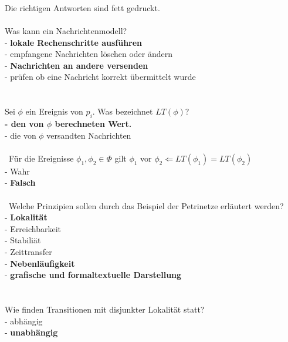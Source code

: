 \documentclass[a4paper,12pt]{scrartcl}
\begin{document}
\subsubsection{}
Die richtigen Antworten sind fett gedruckt.\\\\
Was kann ein Nachrichtenmodell?\\
- \textbf{lokale Rechenschritte ausführen}\\
- empfangene Nachrichten löschen oder ändern\\
- \textbf{Nachrichten an andere versenden}\\
- prüfen ob eine Nachricht korrekt übermittelt wurde\\\\\\
Sei $\phi$ ein Ereignis von $p_i$. Was bezeichnet $LT(\phi)$?\\
\textbf{- den von $\phi$ berechneten Wert.\\}
- die von $\phi$ versandten Nachrichten\\
\\\
Für die Ereignisse $\phi_1 ,\phi_2\in\Phi$ gilt $\phi_1$ vor $\phi_2\Leftarrow LT(\phi_1)=LT(\phi_2)$\\
- Wahr\\
- \textbf{Falsch}\\\\\
Welche Prinzipien sollen durch das Beispiel der Petrinetze erläutert werden?\\
- \textbf{Lokalität}\\
- Erreichbarkeit\\
- Stabiliät\\
- Zeittransfer\\
- \textbf{Nebenläufigkeit}\\
- \textbf{grafische und formaltextuelle Darstellung}\\\\\\
Wie finden Transitionen mit disjunkter Lokalität statt?\\
- abhängig\\
- \textbf{unabhängig}\\
\end{document}
